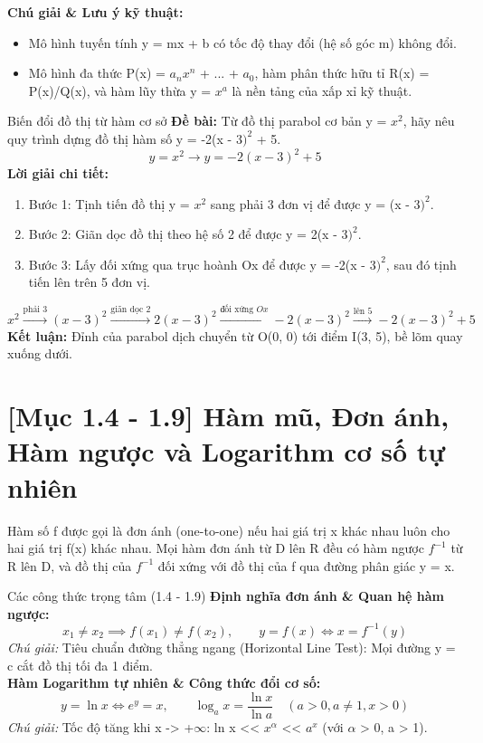 \documentclass[11pt,a4paper,oneside]{book}
\begin{document}
\noindent\textbf{Chú giải \& Lưu ý kỹ thuật:}
\begin{itemize}[leftmargin=1.5em, itemsep=2pt]
  \item Mô hình tuyến tính y = mx + b có tốc độ thay đổi (hệ số góc m) không đổi.
  \item Mô hình đa thức P(x) = $a_n x^n$ + ... + $a_0$, hàm phân thức hữu tỉ R(x) = P(x)/Q(x), và hàm lũy thừa y = $x^a$ là nền tảng của xấp xỉ kỹ thuật.
\end{itemize}

\begin{vidu}{Biến đổi đồ thị từ hàm cơ sở}
\textbf{Đề bài:} Từ đồ thị parabol cơ bản y = $x^2$, hãy nêu quy trình dựng đồ thị hàm số y = -2(x - $3)^2$ + 5.
\[ y = x^2 \longrightarrow y = -2(x - 3)^2 + 5 \]
\textbf{Lời giải chi tiết:}
\begin{enumerate}[leftmargin=1.5em, itemsep=2pt]
  \item Bước 1: Tịnh tiến đồ thị y = $x^2$ sang phải 3 đơn vị để được y = (x - $3)^2$.
  \item Bước 2: Giãn dọc đồ thị theo hệ số 2 để được y = 2(x - $3)^2$.
  \item Bước 3: Lấy đối xứng qua trục hoành Ox để được y = -2(x - $3)^2$, sau đó tịnh tiến lên trên 5 đơn vị.
\end{enumerate}
\[ x^2 \xrightarrow{\text{phải } 3} (x-3)^2 \xrightarrow{\text{giãn dọc } 2} 2(x-3)^2 \xrightarrow{\text{đối xứng } Ox} -2(x-3)^2 \xrightarrow{\text{lên } 5} -2(x-3)^2 + 5 \]
\noindent\textbf{Kết luận:} Đỉnh của parabol dịch chuyển từ O(0, 0) tới điểm I(3, 5), bề lõm quay xuống dưới.
\end{vidu}

\section{[Mục 1.4 - 1.9] Hàm mũ, Đơn ánh, Hàm ngược và Logarithm cơ số tự nhiên}
Hàm số f được gọi là đơn ánh (one-to-one) nếu hai giá trị x khác nhau luôn cho hai giá trị f(x) khác nhau. Mọi hàm đơn ánh từ D lên R đều có hàm ngược $f^{-1}$ từ R lên D, và đồ thị của $f^{-1}$ đối xứng với đồ thị của f qua đường phân giác y = x.

\begin{congthuc}{Các công thức trọng tâm (1.4 - 1.9)}
\noindent\textbf{Định nghĩa đơn ánh \& Quan hệ hàm ngược:}
\[ x_1 \neq x_2 \implies f(x_1) \neq f(x_2), \qquad y = f(x) \iff x = f^{-1}(y) \]
\noindent\textit{Chú giải:} Tiêu chuẩn đường thẳng ngang (Horizontal Line Test): Mọi đường y = c cắt đồ thị tối đa 1 điểm.\\[4pt]
\noindent\textbf{Hàm Logarithm tự nhiên \& Công thức đổi cơ số:}
\[ y = \ln x \iff e^y = x, \qquad \log_a x = \frac{\ln x}{\ln a} \quad (a > 0, a \neq 1, x > 0) \]
\noindent\textit{Chú giải:} Tốc độ tăng khi x -> +$\infty$: ln x << $x^\alpha$  << $a^x$ (với $\alpha$  > 0, a > 1).\\[4pt]
\end{congthuc}
\end{document}
